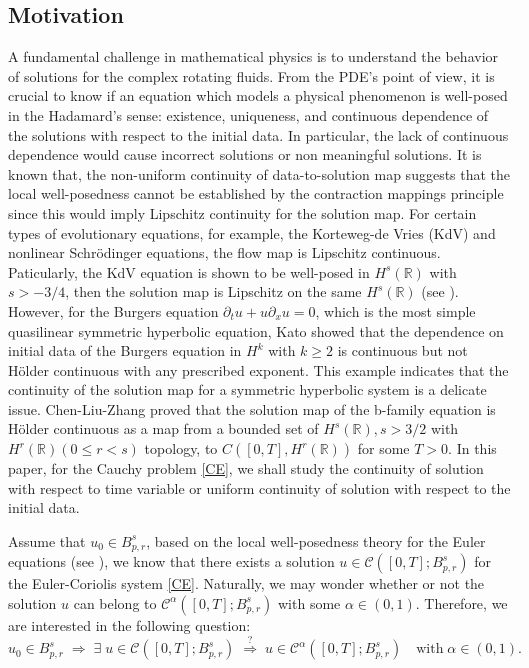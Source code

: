 \documentclass[12pt]{article}
\newcommand{\pa}{\partial}
\newcommand{\R}{\mathbb{R}}
\begin{document}
\subsection{Motivation}


A fundamental challenge in mathematical physics is to understand the behavior of solutions for the complex rotating fluids. From the PDE's point of view, it is crucial to know if an equation which models a physical phenomenon is well-posed in the Hadamard's sense: existence, uniqueness, and continuous dependence of the solutions with respect to the initial data. In particular, the lack of continuous dependence would cause incorrect solutions or non meaningful solutions. It is known that, the non-uniform continuity of data-to-solution map suggests that the local well-posedness cannot be established by the contraction mappings principle since this would imply Lipschitz continuity for the solution map.  For certain types of evolutionary equations, for example, the Korteweg-de Vries (KdV) and nonlinear Schr\"{o}dinger equations, the flow map is Lipschitz continuous. Paticularly, the KdV equation is shown to be well-posed in $H^s(\R)$ with $s>-3/4$, then the solution map is Lipschitz on the same $H^s(\R)$ (see \cite{Kenig}). However, for the Burgers equation
$\partial_t u+u\pa_xu=0$, which is the most simple quasilinear symmetric hyperbolic equation,
Kato \cite{Kato75} showed that the dependence on initial data of the Burgers equation in $H^k$ with $k \geq 2$ is continuous but not H\"{o}lder continuous with any prescribed exponent. This example indicates that the continuity of the solution map for a symmetric hyperbolic system is a delicate issue. Chen-Liu-Zhang \cite{CLZ} proved that the solution map of the b-family equation is H\"{o}lder continuous as a map from a bounded set of $H^s(\R),s > 3/2$ with $H^r(\R) (0 \leq r < s)$ topology, to $C([0, T ], H^r(\R))$ for some $T > 0$. In this paper, for the Cauchy problem \eqref{CE}, we shall study the continuity of solution with respect to time variable or uniform continuity of solution with respect to the initial data.

Assume that $u_0\in B^s_{p,r}$, based on the local well-posedness theory for the Euler equations (see \cite[Theorem 7.1]{B}), we know that there exists a solution $u\in \mathcal{C}([0,T];B^s_{p,r})$ for the Euler-Coriolis system \eqref{CE}. Naturally, we may wonder whether or not the solution $u$ can belong to $\mathcal{C}^\alpha([0,T];B^s_{p,r})$ with some $\alpha\in(0,1)$. Therefore, we are interested in the following question:
$$u_0\in B^s_{p,r}\;\Rightarrow\; \exists \;u\in \mathcal{C}([0,T];B^s_{p,r})\;\overset{?}{\Rightarrow}\; u\in\mathcal{C}^\alpha([0,T];B^s_{p,r}) \quad\text{with}\; \alpha\in(0,1).$$
\end{document}
